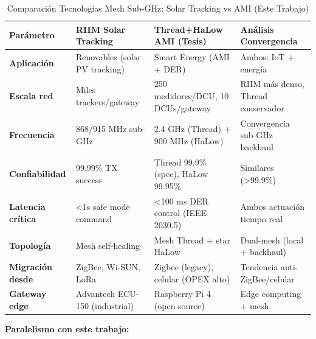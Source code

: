 \begin{table}[H]
\centering
\caption{Comparación Tecnologías Mesh Sub-GHz: Solar Tracking vs AMI (Este Trabajo)}
\label{tab:riim-vs-thesis-comparison}
\scriptsize
\begin{tabular}{|l|p{4cm}|p{4.5cm}|p{4cm}|}
\hline
\textbf{Parámetro} & \textbf{RIIM Solar Tracking} & \textbf{Thread+HaLow AMI (Tesis)} & \textbf{Análisis Convergencia} \\
\hline
\textbf{Aplicación} & Renovables (solar PV tracking) & Smart Energy (AMI + DER) & Ambos: IoT + energía \\
\hline
\textbf{Escala red} & Miles trackers/gateway & 250 medidores/DCU, 10 DCUs/gateway & RIIM más denso, Thread conservador \\
\hline
\textbf{Frecuencia} & 868/915 MHz sub-GHz & 2.4 GHz (Thread) + 900 MHz (HaLow) & Convergencia sub-GHz backhaul \\
\hline
\textbf{Confiabilidad} & 99.99\% TX success & Thread 99.9\% (spec), HaLow 99.95\% & Similares (>99.9\%) \\
\hline
\textbf{Latencia crítica} & <1s safe mode command & <100 ms DER control (IEEE 2030.5) & Ambos actuación tiempo real \\
\hline
\textbf{Topología} & Mesh self-healing & Mesh Thread + star HaLow & Dual-mesh (local + backhaul) \\
\hline
\textbf{Migración desde} & ZigBee, Wi-SUN, LoRa & Zigbee (legacy), celular (OPEX alto) & Tendencia anti-ZigBee/celular \\
\hline
\textbf{Gateway edge} & Advantech ECU-150 (industrial) & Raspberry Pi 4 (open-source) & Edge computing + mesh \\
\hline
\end{tabular}
\end{table}

\textbf{Paralelismo con este trabajo:}


